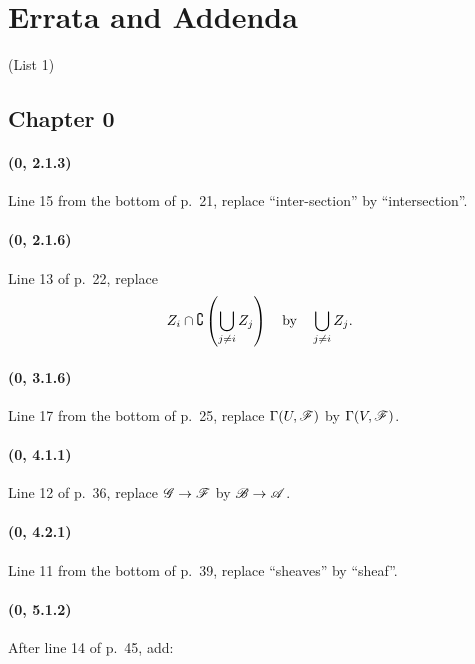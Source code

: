 \clearpage
{}
{}
\section*{Errata and Addenda}
\thispagestyle{plain}
\begin{center}
\large (List 1)
\end{center}

\subsection*{Chapter 0}

\paragraph{(\textbf{0}, 2.1.3)}
Line 15 from the bottom of p.~21, replace ``inter-section'' by
``intersection''.

\paragraph{(\textbf{0}, 2.1.6)}
Line 13 of p.~22, replace
\[
  Z_i\cap\complement\left(\bigcup_{j\ne i}Z_j\right)
  \quad\hbox{by}\quad
  \bigcup_{j\ne i}Z_j.
\]

\paragraph{(\textbf{0}, 3.1.6)}
Line 17 from the bottom of p.~25, replace
$\Gamma(U,\mathscr{F})$ by $\Gamma(V,\mathscr{F})$.

\paragraph{(\textbf{0}, 4.1.1)}
Line 12 of p.~36, replace $\mathscr{G}\to\mathscr{F}$ by
$\mathscr{B}\to\mathscr{A}$.

\paragraph{(\textbf{0}, 4.2.1)}
Line 11 from the bottom of p.~39, replace ``sheaves'' by ``sheaf''.

\paragraph{(\textbf{0}, 5.1.2)}
After line 14 of p.~45, add:


